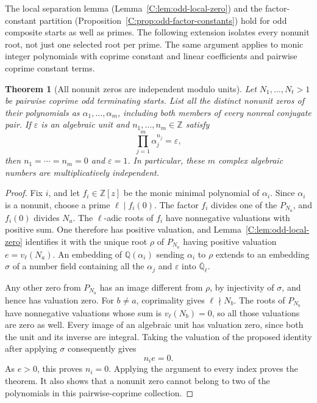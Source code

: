 \documentclass[11pt,a4paper]{article}
\newtheorem{theorem}{Theorem}[section]
\theoremstyle{definition}
\theoremstyle{remark}
\numberwithin{equation}{section}
\begin{document}
The local separation lemma (Lemma~\ref{C:lem:odd-local-zero}) and the
factor-constant partition (Proposition~\ref{C:prop:odd-factor-constants})
hold for odd composite starts as well as primes. The following extension
isolates every nonunit root, not just one selected root per prime.
The same argument applies to monic integer polynomials with coprime
constant and linear coefficients and pairwise coprime constant terms.

\begin{theorem}[All nonunit zeros are independent modulo units]
\label{C:thm:joint-root-independence}
Let $N_1,\ldots,N_t>1$ be pairwise coprime odd terminating starts.
List all the distinct nonunit zeros of their polynomials as
$\alpha_1,\ldots,\alpha_m$, including both members of every nonreal
conjugate pair.
If $\varepsilon$ is an algebraic unit and $n_1,\ldots,n_m\in\mathbb Z$
satisfy
\[
 \prod_{j=1}^m\alpha_j^{n_j}=\varepsilon,
\]
then $n_1=\cdots=n_m=0$ and $\varepsilon=1$.
In particular, these $m$ complex algebraic numbers are
multiplicatively independent.
\end{theorem}

\begin{proof}
Fix $i$, and let $f_i\in\mathbb Z[z]$ be the monic minimal polynomial
of $\alpha_i$.  Since $\alpha_i$ is a nonunit, choose a prime
$\ell\mid f_i(0)$.  The factor $f_i$ divides one of the $P_{N_a}$,
and $f_i(0)$ divides $N_a$.
The $\ell$-adic roots of $f_i$ have nonnegative valuations with
positive sum.  One therefore has positive valuation, and
Lemma~\ref{C:lem:odd-local-zero} identifies it with the unique root
$\rho$ of $P_{N_a}$ having positive valuation $e=v_\ell(N_a)$.
An embedding of $\mathbb Q(\alpha_i)$ sending $\alpha_i$ to $\rho$
extends to an embedding $\sigma$ of a number field containing all
the $\alpha_j$ and $\varepsilon$ into
$\overline{\mathbb Q}_\ell$.

Any other zero from $P_{N_a}$ has an image different from $\rho$,
by injectivity of $\sigma$, and hence has valuation zero.
For $b\ne a$, coprimality gives $\ell\nmid N_b$.
The roots of $P_{N_b}$ have nonnegative valuations whose sum is
$v_\ell(N_b)=0$, so all those valuations are zero as well.
Every image of an algebraic unit has valuation zero, since both
the unit and its inverse are integral.
Taking the valuation of the proposed identity after applying
$\sigma$ consequently gives
\[
 n_i e=0.
\]
As $e>0$, this proves $n_i=0$.  Applying the argument to every index
proves the theorem.
It also shows that a nonunit zero cannot belong to two of the
polynomials in this pairwise-coprime collection.
\end{proof}
\end{document}
